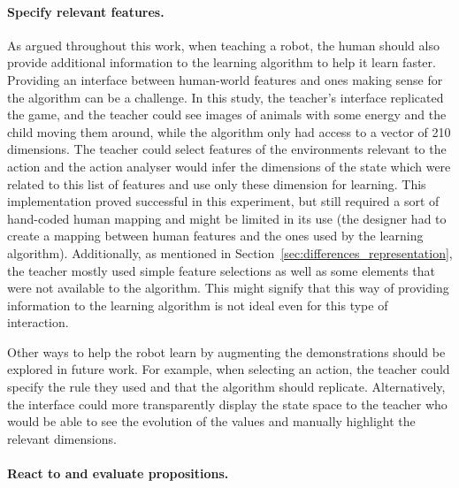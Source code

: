 \paragraph{Specify relevant features.} %

As argued throughout this work, when teaching a robot, the human should also provide additional information to the learning algorithm to help it learn faster. Providing an interface between human-world features and ones making sense for the algorithm can be a challenge. 
In this study, the teacher's interface replicated the game, and the teacher could see images of animals with some energy and the child moving them around, while the algorithm only had access to a vector of 210 dimensions. The teacher could select features of the environments relevant to the action and the action analyser would infer the dimensions of the state which were related to this list of features and use only these dimension for learning. This implementation proved successful in this experiment, but still required a sort of hand-coded human mapping and might be limited in its use (the designer had to create a mapping between human features and the ones used by the learning algorithm). Additionally, as mentioned in Section~\ref{sec:differences_representation}, the teacher mostly used simple feature selections as well as some elements that were not available to the algorithm. This might signify that this way of providing information to the learning algorithm is not ideal even for this type of interaction.

Other ways to help the robot learn by augmenting the demonstrations should be explored in future work. For example, when selecting an action, the teacher could specify the rule they used and that the algorithm should replicate. Alternatively, the interface could more transparently display the state space to the teacher who would be able to see the evolution of the values and manually highlight the relevant dimensions.

\paragraph{React to and evaluate propositions.} %

